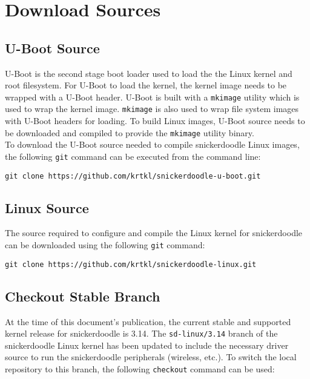 \section{Download Sources}


\subsection{U-Boot Source}
U-Boot is the second stage boot loader used to load the the Linux kernel and root filesystem. For U-Boot to load the kernel, the kernel image needs to be wrapped with a U-Boot header. U-Boot is built with a \texttt{mkimage} utility which is used to wrap the kernel image. \texttt{mkimage} is also used to wrap file system images with U-Boot headers for loading. To build Linux images, U-Boot source needs to be downloaded and compiled to provide the \texttt{mkimage} utility binary. \\

\noindent
To download the U-Boot source needed to compile snickerdoodle Linux images, the following \texttt{git} command can be executed from the command line: \\

\begin{lstlisting}[style=text]
git clone https://github.com/krtkl/snickerdoodle-u-boot.git
\end{lstlisting}


\subsection{Linux Source}
The source required to configure and compile the Linux kernel for snickerdoodle can be downloaded using the following \texttt{git} command: \\

\begin{lstlisting}[style=text]
git clone https://github.com/krtkl/snickerdoodle-linux.git
\end{lstlisting}


\subsection{Checkout Stable Branch}
At the time of this document's publication, the current stable and supported kernel release for snickerdoodle is 3.14. The \texttt{sd-linux/3.14} branch of the snickerdoodle Linux kernel has been updated to include the necessary driver source to run the snickerdoodle peripherals (wireless, etc.). To switch the local repository to this branch, the following \texttt{checkout} command can be used: \\

